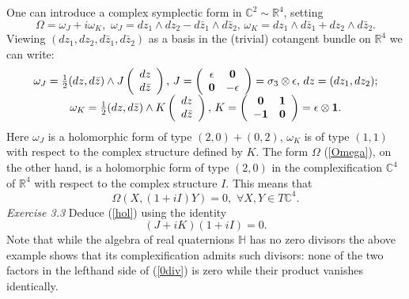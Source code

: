 \documentclass[12pt]{article}
\begin{document}
One can introduce a complex symplectic form in ${\mathbb C}^2 \sim{\mathbb R}^4$, setting
\begin{equation}
\label{Omega}
\Omega = \omega_J + i\omega_K, \, \, \omega_J = dz_1\wedge dz_2 - d{\bar z}_1\wedge d{\bar z}_2,
\, \omega_K = dz_1\wedge d{\bar z}_1 + dz_2\wedge d{\bar z}_2. 
\end{equation}
{\footnotesize Viewing $(dz_1, dz_2, d{\bar z}_1, d{\bar z}_2)$ as a basis in the (trivial) cotangent bundle 
on ${\mathbb R}^4$ we can write:}
\begin{equation}
\label{JK}
\begin{array}{c}
\omega_J =\frac{1}{2} (dz, d{\bar z})\wedge J \left( 
\begin{array}{c}
dz \\ d{\bar z}
\end{array}
\right) ,
\, J =\left( 
\begin{array}{cc}
\epsilon & {\bf 0} \\
{\bf 0} & -\epsilon
\end{array}
\right) = \sigma_3 \otimes \epsilon, \, dz = (dz_1, dz_2);\\
 \omega_K =\frac{1}{2} (dz, d{\bar z})\wedge K \left( 
\begin{array}{c}
dz \\ d{\bar z}
\end{array}
\right) , \, K =\left( 
\begin{array}{cc}
{\bf 0} & {\bf 1} \\
-{\bf 1} & {\bf 0}
\end{array}
\right) = \epsilon \otimes {\bf 1}.
\end{array}
\end{equation}
Here $\omega_J$ is a holomorphic form of type $(2, 0) + (0,2)$, $\omega_K$ is of
 type $(1,1)$ with respect to the complex structure defined by $K$. The form 
$\Omega$ (\ref{Omega}), on the other hand, is a holomorphic form of type 
$(2, 0)$ in the complexification ${\mathbb C}^4$ of ${\mathbb R}^4$ with respect
 to the complex structure $I$. This means that 
\begin{equation}
\label{hol}
\Omega(X, (1+i I)Y) = 0,  \, \, \forall X, Y \in T{\mathbb C}^4.
\end{equation}
{\it Exercise 3.3} Deduce (\ref{hol}) using the identity
\begin{equation}
\label{0div}
(J + i K)(1 + i I) = 0.
\end{equation}
Note that while the algebra of real quaternions $\mathbb H$
has no zero divisors the above example shows that its complexification admits
such divisors: none of the two factors in the lefthand side of (\ref{0div}) is 
zero while their product vanishes identically.
\end{document}
